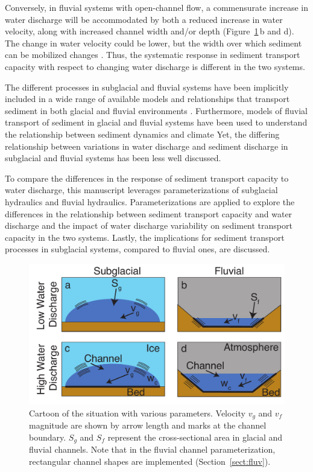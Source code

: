 \documentclass[11pt]{article}
\begin{document}
\begin{spacing}{1}
  Conversely, in fluvial systems with open-channel flow, a commensurate increase in water discharge will be accommodated by both a reduced increase in water velocity, along with increased channel width and/or depth (Figure~\ref{fig:cartoon}\,b and d).
  The change in water velocity could be lower, but the width over which sediment can be mobilized changes \citep{leopold1953}.
  Thus, the systematic response in sediment transport capacity with respect to changing water discharge is  different in the two systems.
  
  The different processes in subglacial and fluvial systems have been implicitly included in a wide range of available models and relationships that transport sediment in both glacial and fluvial environments \citep[e.g.][]{walder1994,tucker1997,beaud2018,wickert2019}.
  Furthermore, models of fluvial transport of sediment in glacial and fluvial systems have been used to understand the relationship between sediment dynamics and climate \citep[e.g.][]{tucker1997,delaney2020}
  Yet, the differing relationship between variations in water discharge and sediment discharge in subglacial and fluvial systems has been less well discussed.
  
  To compare the differences in the response of sediment transport capacity to water discharge, this manuscript leverages parameterizations of subglacial hydraulics and fluvial hydraulics.
  Parameterizations are applied to explore the differences in the relationship between sediment transport capacity and water discharge and the impact of water discharge variability on sediment transport capacity in the two systems.
  Lastly, the implications for sediment transport processes in subglacial systems, compared to fluvial ones, are discussed.
  
  \begin{center}
    \begin{figure}[H]
      \includegraphics[width=0.65\linewidth]{Cartoon.pdf}
      \caption{Cartoon of the situation with various parameters. Velocity $v_g$ and $v_f$ magnitude are shown by arrow length and marks at the channel boundary. $S_g$ and $S_f$ represent the cross-sectional area in glacial and fluvial channels.  Note that in the fluvial channel parameterization, rectangular channel shapes are implemented (Section~\ref{sect:fluv}).} 
      \label{fig:cartoon}
    \end{figure}
  \end{center}
  

\end{spacing}
\end{document}

